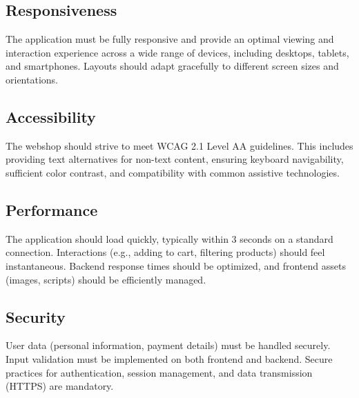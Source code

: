 \documentclass[a4paper,11pt]{article}
\begin{document}
\subsection{Responsiveness}
The application must be fully responsive and provide an optimal viewing and interaction experience across a wide range of devices, including desktops, tablets, and smartphones. Layouts should adapt gracefully to different screen sizes and orientations.

\subsection{Accessibility}
The webshop should strive to meet WCAG 2.1 Level AA guidelines. This includes providing text alternatives for non-text content, ensuring keyboard navigability, sufficient color contrast, and compatibility with common assistive technologies.

\subsection{Performance}
The application should load quickly, typically within 3 seconds on a standard connection. Interactions (e.g., adding to cart, filtering products) should feel instantaneous. Backend response times should be optimized, and frontend assets (images, scripts) should be efficiently managed.

\subsection{Security}
User data (personal information, payment details) must be handled securely. Input validation must be implemented on both frontend and backend. Secure practices for authentication, session management, and data transmission (HTTPS) are mandatory.


\end{document}
